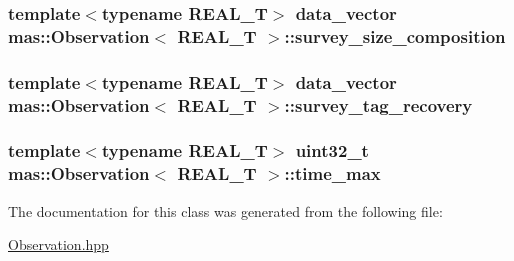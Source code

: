 \subsubsection[{survey\+\_\+size\+\_\+composition}]{\setlength{\rightskip}{0pt plus 5cm}template$<$typename R\+E\+A\+L\+\_\+\+T$>$ data\+\_\+vector {\bf mas\+::\+Observation}$<$ R\+E\+A\+L\+\_\+\+T $>$\+::survey\+\_\+size\+\_\+composition}\label{classmas_1_1_observation_a560882c02800a3157afa3d62ca3bbf98}
\hypertarget{classmas_1_1_observation_aac55e9d5be6d73e97476f89751cfa8f9}{}
\subsubsection[{survey\+\_\+tag\+\_\+recovery}]{\setlength{\rightskip}{0pt plus 5cm}template$<$typename R\+E\+A\+L\+\_\+\+T$>$ data\+\_\+vector {\bf mas\+::\+Observation}$<$ R\+E\+A\+L\+\_\+\+T $>$\+::survey\+\_\+tag\+\_\+recovery}\label{classmas_1_1_observation_aac55e9d5be6d73e97476f89751cfa8f9}
\hypertarget{classmas_1_1_observation_a54f6b6af3aab188189e52432c42c20a0}{}
\subsubsection[{time\+\_\+max}]{\setlength{\rightskip}{0pt plus 5cm}template$<$typename R\+E\+A\+L\+\_\+\+T$>$ uint32\+\_\+t {\bf mas\+::\+Observation}$<$ R\+E\+A\+L\+\_\+\+T $>$\+::time\+\_\+max}\label{classmas_1_1_observation_a54f6b6af3aab188189e52432c42c20a0}


The documentation for this class was generated from the following file\+:\begin{DoxyCompactItemize}
\item 
\hyperlink{_observation_8hpp}{Observation.\+hpp}\end{DoxyCompactItemize}
